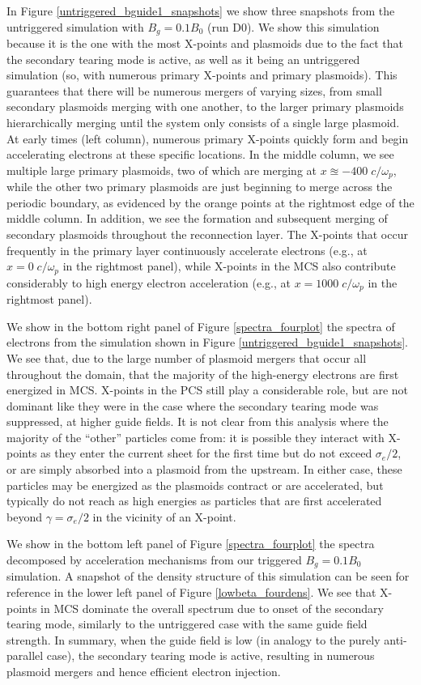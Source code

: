 In Figure \ref{untriggered_bguide1_snapshots} we show three snapshots from the untriggered simulation with $B_{g}=0.1B_{0}$ (run D0).  We show this simulation because it is the one with the most X-points and plasmoids due to the fact that the secondary tearing mode is active, as well as it being an untriggered simulation (so, with numerous primary X-points and primary plasmoids).  This guarantees that there will be numerous mergers of varying sizes, from small secondary plasmoids merging with one another, to the larger primary plasmoids hierarchically merging until the system only consists of a single large plasmoid.  At early times (left column), numerous primary X-points quickly form and begin accelerating electrons at these specific locations.  In the middle column, we see multiple large primary plasmoids, two of which are merging at $x \approxeq -400 \; c/\omega_{p}$, while the other two primary plasmoids are just beginning to merge across the periodic boundary, as evidenced by the orange points at the rightmost edge of the middle column.  In addition, we see the formation and subsequent merging of secondary plasmoids throughout the reconnection layer.  The X-points that occur frequently in the primary layer continuously accelerate electrons (e.g., at $x=0 \; c/\omega_{p}$ in the rightmost panel), while X-points in the MCS also contribute considerably to high energy electron acceleration (e.g., at $x=1000 \; c/\omega_{p}$ in the rightmost panel). 

We show in the bottom right panel of Figure \ref{spectra_fourplot} the spectra of electrons from the simulation shown in Figure \ref{untriggered_bguide1_snapshots}.  We see that, due to the large number of plasmoid mergers that occur all throughout the domain, that the majority of the high-energy electrons are first energized in MCS.  X-points in the PCS still play a considerable role, but are not dominant like they were in the case where the secondary tearing mode was suppressed, at higher guide fields.  It is not clear from this analysis where the majority of the ``other'' particles come from: it is possible they interact with X-points as they enter the current sheet for the first time but do not exceed $\sigma_{e}/2$, or are simply absorbed into a plasmoid from the upstream.  In either case, these particles may be energized as the plasmoids contract or are accelerated, but typically do not reach as high energies as particles that are first accelerated beyond $\gamma=\sigma_{e}/2$ in the vicinity of an X-point.

We show in the bottom left panel of Figure \ref{spectra_fourplot} the spectra decomposed by acceleration mechanisms from our triggered $B_{g}=0.1B_{0}$ simulation.  A snapshot of the density structure of this simulation can be seen for reference in the lower left panel of Figure \ref{lowbeta_fourdens}.  We see that X-points in MCS dominate the overall spectrum due to onset of the secondary tearing mode, similarly to the untriggered case with the same guide field strength.  In summary, when the guide field is low (in analogy to the purely anti-parallel case), the secondary tearing mode is active, resulting in numerous plasmoid mergers and hence efficient electron injection.




